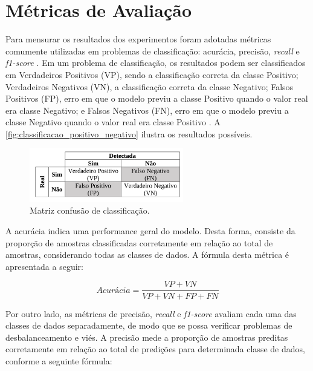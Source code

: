 \section{Métricas de Avaliação}

Para mensurar os resultados dos experimentos foram adotadas métricas comumente utilizadas em problemas de classificação: acurácia, precisão, \textit{recall} e \textit{f1-score} \cite{Rodrigues2020,Rodrigues2021,Shung2020}. Em um problema de classificação, os resultados podem ser classificados em Verdadeiros Positivos (VP), sendo a classificação correta da classe Positivo; Verdadeiros Negativos (VN), a classificação correta da classe Negativo; Falsos Positivos (FP), erro em que o modelo previu a classe Positivo quando o valor real era classe Negativo; e Falsos Negativos (FN), erro em que o modelo previu a classe Negativo quando o valor real era classe Positivo \cite{Rodrigues2020}. A \autoref{fig:classificacao_positivo_negativo} ilustra os resultados possíveis.

\begin{figure}[h]
  \centering
  \caption{Matriz confusão de classificação.}
   \label{fig:classificacao_positivo_negativo}
   \includegraphics[width=0.6\textwidth]{figuras/fig_13.png}
\end{figure}

A acurácia indica uma performance geral do modelo. Desta forma, consiste da proporção de amostras classificadas corretamente em relação ao total de amostras, considerando todas as classes de dados. A fórmula desta métrica é apresentada a seguir:

\begin{center}
  \[
  \textit{Acurácia} = \frac{VP + VN}{VP + VN + FP + FN}
  \]
\end{center}

Por outro lado, as métricas de precisão, \textit{recall} e \textit{f1-score} avaliam cada uma das classes de dados separadamente, de modo que se possa verificar problemas de desbalanceamento e viés. A precisão mede a proporção de amostras preditas corretamente em relação ao total de predições para determinada classe de dados, conforme a seguinte fórmula:

